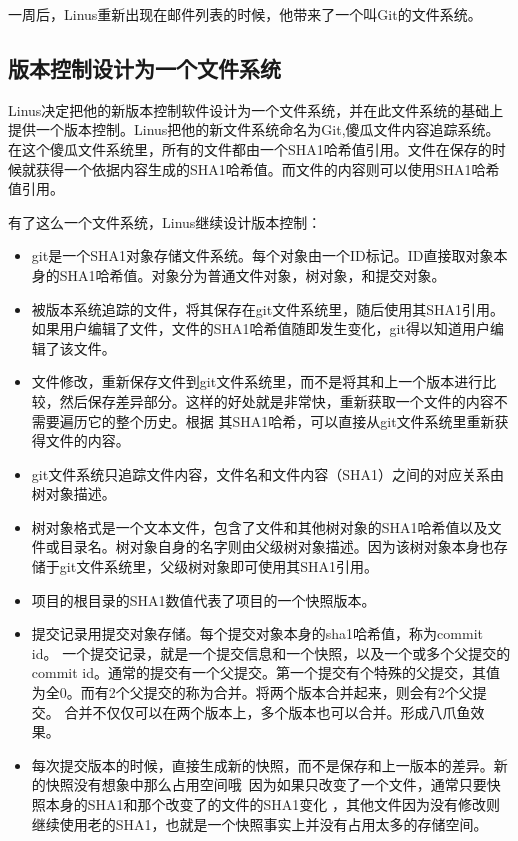 一周后，Linus重新出现在邮件列表的时候，他带来了一个叫Git的文件系统。

\subsection{版本控制设计为一个文件系统}

Linus决定把他的新版本控制软件设计为一个文件系统，并在此文件系统的基础上提供一个版本控制。Linus把他的新文件系统命名为Git,傻瓜文件内容追踪系统。
在这个傻瓜文件系统里，所有的文件都由一个SHA1哈希值引用。文件在保存的时候就获得一个依据内容生成的SHA1哈希值。而文件的内容则可以使用SHA1哈希值引用。

有了这么一个文件系统，Linus继续设计版本控制：

\begin{itemize}
\item git是一个SHA1对象存储文件系统。每个对象由一个ID标记。ID直接取对象本身的SHA1哈希值。对象分为普通文件对象，树对象，和提交对象。
\item 被版本系统追踪的文件，将其保存在git文件系统里，随后使用其SHA1引用。如果用户编辑了文件，文件的SHA1哈希值随即发生变化，git得以知道用户编辑了该文件。
\item 文件修改，重新保存文件到git文件系统里，而不是将其和上一个版本进行比较，然后保存差异部分。这样的好处就是非常快，重新获取一个文件的内容不需要遍历它的整个历史。根据 其SHA1哈希，可以直接从git文件系统里重新获得文件的内容。
\item git文件系统只追踪文件内容，文件名和文件内容（SHA1）之间的对应关系由树对象描述。
\item 树对象格式是一个文本文件，包含了文件和其他树对象的SHA1哈希值以及文件或目录名。树对象自身的名字则由父级树对象描述。因为该树对象本身也存储于git文件系统里，父级树对象即可使用其SHA1引用。

\item 项目的根目录的SHA1数值代表了项目的一个快照版本。
\item 提交记录用提交对象存储。每个提交对象本身的sha1哈希值，称为commit id。 一个提交记录，就是一个提交信息和一个快照，以及一个或多个父提交的commit id。通常的提交有一个父提交。第一个提交有个特殊的父提交，其值为全0。而有2个父提交的称为合并。将两个版本合并起来，则会有2个父提交。
合并不仅仅可以在两个版本上，多个版本也可以合并。形成八爪鱼效果。
\item 每次提交版本的时候，直接生成新的快照，而不是保存和上一版本的差异。新的快照没有想象中那么占用空间哦~因为如果只改变了一个文件，通常只要快照本身的SHA1和那个改变了的文件的SHA1变化 ，其他文件因为没有修改则继续使用老的SHA1，也就是一个快照事实上并没有占用太多的存储空间。

\end{itemize}

